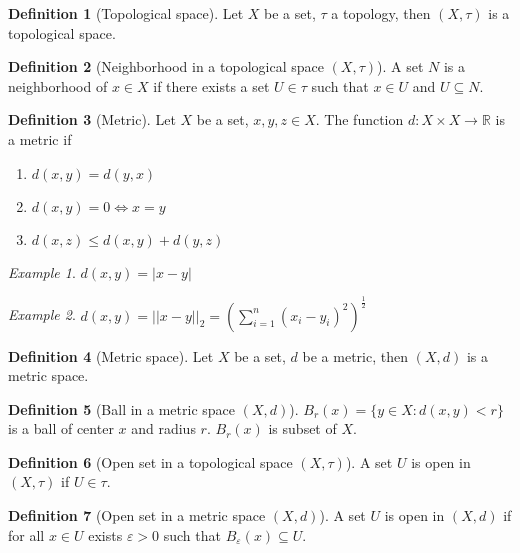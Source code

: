 \documentclass{article}
\newcommand{\DS}{\displaystyle}
\newcommand{\abs}[1]{\left|#1\right|}
\newcommand{\ar}{\rightarrow}
\newenvironment{enumrom}{\begin{enumerate}[label=(\roman*)]}{\end{enumerate}}
\theoremstyle{definition}
\newtheorem{definition}{Definition}[section]
\theoremstyle{definition}
\theoremstyle{plain}
\theoremstyle{plain}
\theoremstyle{plain}
\theoremstyle{plain}
\theoremstyle{definition}
\theoremstyle{remark}
\newtheorem{exampled}{Example}[definition]
\theoremstyle{remark}
\theoremstyle{remark}
\theoremstyle{remark}
\newcommand{\R}{\mathbb{R}}
\newcommand{\E}{\varepsilon}
\begin{document}
\begin{definition}[Topological space]
  Let $X$ be a set, $\tau$ a topology, then $(X, \tau)$ is a topological space.
\end{definition}


\begin{definition}[Neighborhood in a topological space $(X, \tau)$]
  A set $N$ is a neighborhood of $x \in X$ if there exists a set $U \in \tau$ such that $x \in U$ and $U \subseteq N$.
\end{definition}


\begin{definition}[Metric]
  Let $X$ be a set, $x, y, z \in X$. The function $d : X \times X \ar \R$ is a metric if
  \begin{enumrom}
  \item $d(x,y) = d(y,x)$
  \item $d(x,y) = 0 \iff x = y$
  \item $d(x,z) \leq d(x,y) + d(y,z)$
  \end{enumrom}
\end{definition}

\begin{exampled}
  $d(x,y) = \abs{x - y}$
\end{exampled}

\begin{exampled}
  $\DS d(x,y) = ||x - y||_2 = \left(\sum_{i = 1}^n (x_i - y_i)^2\right)^{\frac{1}{2}}$
\end{exampled}


\begin{definition}[Metric space]
  Let $X$ be a set, $d$ be a metric, then $(X, d)$ is a metric space.
\end{definition}


\begin{definition}[Ball in a metric space $(X, d)$]
  $B_r(x) = \{ y \in X : d(x,y) < r \}$ is a ball of center $x$ and radius $r$. $B_r(x)$ is subset of $X$.
\end{definition}


\begin{definition}[Open set in a topological space $(X, \tau)$]
  A set $U$ is open in $(X, \tau)$ if $U \in \tau$.
\end{definition}


\begin{definition}[Open set in a metric space $(X, d)$]
  A set $U$ is open in $(X, d)$ if for all $x \in U$ exists $\E > 0$ such that $B_\E(x) \subseteq U$.
\end{definition}
\end{document}
